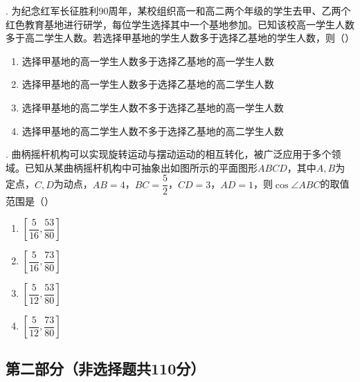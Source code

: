 . 为纪念红军长征胜利90周年，某校组织高一和高二两个年级的学生去甲、乙两个红色教育基地进行研学，每位学生选择其中一个基地参加。已知该校高一学生人数多于高二学生人数。若选择甲基地的学生人数多于选择乙基地的学生人数，则（\quad）
\begin{enumerate}[label=\Alph*.,leftmargin=2.2em]
  \item 选择甲基地的高一学生人数多于选择乙基地的高一学生人数
  \item 选择甲基地的高一学生人数多于选择乙基地的高二学生人数
  \item 选择甲基地的高二学生人数不多于选择乙基地的高一学生人数
  \item 选择甲基地的高二学生人数不多于选择乙基地的高二学生人数
\end{enumerate}

. 曲柄摇杆机构可以实现旋转运动与摆动运动的相互转化，被广泛应用于多个领域。已知从某曲柄摇杆机构中可抽象出如图所示的平面图形$ABCD$，其中$A,B$为定点，$C,D$为动点，$AB=4$，$BC=\dfrac52$，$CD=3$，$AD=1$，则$\cos\angle ABC$的取值范围是（\quad）

\begin{center}
\begin{minipage}{0.46\textwidth}
\begin{enumerate}[label=\Alph*.,leftmargin=*]
  \item $\left[\dfrac5{16},\dfrac{53}{80}\right]$
  \item $\left[\dfrac5{16},\dfrac{73}{80}\right]$
  \item $\left[\dfrac5{12},\dfrac{53}{80}\right]$
  \item $\left[\dfrac5{12},\dfrac{73}{80}\right]$
\end{enumerate}
\end{minipage}\hfill
\begin{minipage}{0.48\textwidth}
\centering
{}
\end{minipage}
\end{center}

\subsection*{第二部分（非选择题\quad 共110分）}

